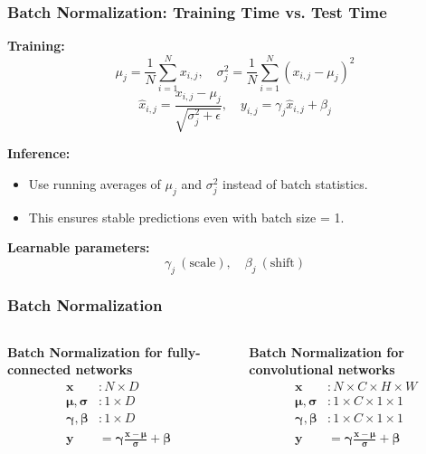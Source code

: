 \documentclass[default, aspectratio=169]{beamer}
\begin{document}
    \begin{frame}
    \frametitle{Batch Normalization: Training Time vs. Test Time}
    
    \textbf{Training:}
    \[
    \mu_j = \frac{1}{N} \sum_{i=1}^N x_{i,j}, \quad
    \sigma_j^2 = \frac{1}{N} \sum_{i=1}^N (x_{i,j} - \mu_j)^2
    \]
    \[
    \hat{x}_{i,j} = \frac{x_{i,j} - \mu_j}{\sqrt{\sigma_j^2 + \epsilon}}, \quad
    y_{i,j} = \gamma_j \hat{x}_{i,j} + \beta_j
    \]
    
    \textbf{Inference:}
    \begin{itemize}
        \item Use running averages of $\mu_j$ and $\sigma_j^2$ instead of batch statistics.
        \item This ensures stable predictions even with batch size = 1.
    \end{itemize}
    
    \textbf{Learnable parameters:}
    \[
    \gamma_j \ (\text{scale}), \quad \beta_j \ (\text{shift})
    \]
    \end{frame}
    
    \begin{frame}
    \frametitle{Batch Normalization}
    \begin{columns}[T]
        \centering
        \textbf{Batch Normalization for fully-connected networks}
        \[
        \begin{aligned}
        \mathbf{x} &: N \times D \\
        \boldsymbol{\mu}, \boldsymbol{\sigma} &: 1 \times D \\
        \boldsymbol{\gamma}, \boldsymbol{\beta} &: 1 \times D \\
        \mathbf{y} &= \boldsymbol{\gamma} \frac{\mathbf{x} - \boldsymbol{\mu}}{\boldsymbol{\sigma}} + \boldsymbol{\beta}
        \end{aligned}
        \]
        
        \centering
        \textbf{Batch Normalization for convolutional networks}
        \[
        \begin{aligned}
        \mathbf{x} &: N \times C \times H \times W \\
        \boldsymbol{\mu}, \boldsymbol{\sigma} &: 1 \times C \times 1 \times 1 \\
        \boldsymbol{\gamma}, \boldsymbol{\beta} &: 1 \times C \times 1 \times 1 \\
        \mathbf{y} &= \boldsymbol{\gamma} \frac{\mathbf{x} - \boldsymbol{\mu}}{\boldsymbol{\sigma}} + \boldsymbol{\beta}
        \end{aligned}
        \]
    \end{columns}
\end{frame}
\end{document}
